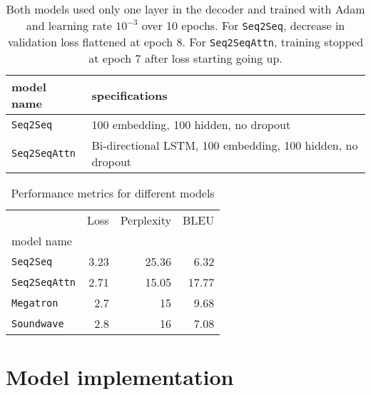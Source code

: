 \documentclass[12pt]{article}
\begin{document}
\begin{landscape}
\begin{table}[tb]
    
    \centering
\begin{tabular}{ll}
\toprule
model name                   &specifications\\
\midrule
\texttt{Seq2Seq} & 100 embedding, 100 hidden, no dropout\\
\texttt{Seq2SeqAttn} & Bi-directional LSTM, 100 embedding, 100 hidden, no dropout\\
\bottomrule
\end{tabular}
    \caption{Both models used only one layer in the decoder and trained with Adam and learning rate $10^{-3}$ over 10 epochs. For \texttt{Seq2Seq}, decrease in validation loss flattened at epoch 8. For \texttt{Seq2SeqAttn}, training stopped at epoch 7 after loss starting going up.}
    \label{tab:spec}
\end{table}
\begin{table}[h]
\centering
\begin{tabular}{lrrr}
\toprule
{}                                     & Loss  & Perplexity & BLEU \\
model name                             &       &        & \\
\midrule
\texttt{Seq2Seq}                      & 3.23 & 25.36  & 6.32 \\
\texttt{Seq2SeqAttn}                      & 2.71 & 15.05  & 17.77 \\
\texttt{Megatron} & 2.7 & 15 & 9.68 \\
\texttt{Soundwave} & 2.8 & 16 & 7.08\\
\bottomrule
\end{tabular}
\caption{Performance metrics for different models}
\label{table:performance}
\end{table}
\end{landscape}




\appendix
\section{Model implementation}
% 

\end{document}
